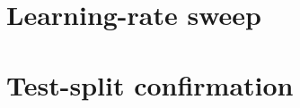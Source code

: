 \documentclass[11pt]{article}
\begin{document}
\section{Learning-rate sweep}\label{sec:lr}

\begin{table}[t]
\centering
\small
\caption{Validation bpc after 1,500 steps of 16 $\times$ 512 bytes for each peak learning rate (seed 0). The best rate per model is in bold.}\label{tab:lr}
\end{table}

\section{Test-split confirmation}\label{sec:test}
\end{document}
